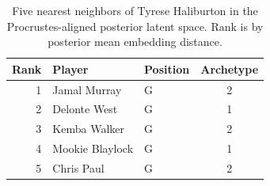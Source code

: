 \begin{table}[htbp]
  \centering\small
  \begin{tabular}{rllc}
    \toprule
    Rank & Player & Position & Archetype \\
    \midrule
    1 & Jamal Murray & G & 2 \\
    2 & Delonte West & G & 1 \\
    3 & Kemba Walker & G & 2 \\
    4 & Mookie Blaylock & G & 1 \\
    5 & Chris Paul & G & 2 \\
    \bottomrule
  \end{tabular}
  \caption{Five nearest neighbors of Tyrese Haliburton in the Procrustes-aligned posterior latent space. Rank is by posterior mean embedding distance.}
  \label{tab:Tyrese_Haliburton_neighbors}
\end{table}

